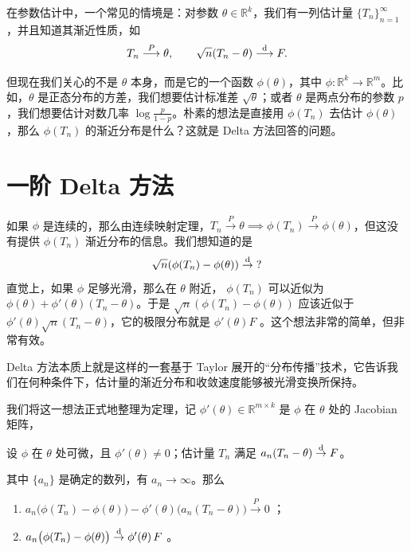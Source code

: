在参数估计中，一个常见的情境是：对参数 $\theta\in\mathbb R^k$，我们有一列估计量 $\{T_n\}_{n=1}^\infty$，并且知道其渐近性质，如
\[
T_n\overset{P}\longrightarrow\theta,
\qquad
\sqrt n(T_n-\theta)\overset{\rm d}\longrightarrow F.
\]

但现在我们关心的不是 $\theta$ 本身，而是它的一个函数 $\phi(\theta)$，其中 $\phi:\mathbb R^k\to\mathbb R^m$。比如，$\theta$ 是正态分布的方差，我们想要估计标准差 $\sqrt\theta$；或者 $\theta$ 是两点分布的参数 $p$，我们想要估计对数几率 $\log\tfrac p{1-p}$。朴素的想法是直接用 $\phi(T_n)$ 去估计 $\phi(\theta)$，那么 $\phi(T_n)$ 的渐近分布是什么？这就是 Delta 方法回答的问题。

\section{一阶 Delta 方法}

如果 $\phi$ 是连续的，那么由连续映射定理，$T_n\overset{P}\to\theta\implies \phi(T_n) \overset{P}\to \phi(\theta)$，但这没有提供 $\phi(T_n)$ 渐近分布的信息。我们想知道的是
\[\sqrt n(\phi(T_n)-\phi(\theta))\overset{\rm d}\to \;?\]
直觉上，如果 $\phi$ 足够光滑，那么在 $\theta$ 附近， $\phi(T_n)$ 可以近似为 $\phi(\theta) + \phi'(\theta)(T_n-\theta)$。于是 $\sqrt{n}(\phi(T_n)-\phi(\theta))$ 应该近似于 $\phi'(\theta) \sqrt{n}(T_n-\theta)$，它的极限分布就是 $\phi'(\theta)F$ 。这个想法非常的简单，但非常有效。

Delta 方法本质上就是这样的一套基于 Taylor 展开的``分布传播''技术，它告诉我们在何种条件下，估计量的渐近分布和收敛速度能够被光滑变换所保持。

我们将这一想法正式地整理为定理，记 $\phi'(\theta)\in\mathbb R^{m\times k}$ 是 $\phi$ 在 $\theta$ 处的 Jacobian 矩阵，

\begin{theorem}[一阶 Delta 方法]\label{thm:ch5:first-order-delta}

设 $\phi$ 在 $\theta$ 处可微，且 $\phi'(\theta)\neq 0$；估计量 $T_n$ 满足 $a_n(T_n-\theta)\overset{\rm d}\to F$。

其中 $\{a_n\}$ 是确定的数列，有 $a_n\to \infty$。那么

\begin{enumerate}
\def\labelenumi{\arabic{enumi}.}
\tightlist
\item
  $a_n\big(\phi(T_n)-\phi(\theta)\big) - \phi'(\theta)\big(a_n(T_n-\theta)\big) \overset{P}\to 0$ ；
\item
  $a_n\big(\phi(T_n)-\phi(\theta)\big) \overset{\rm d}\to \phi'(\theta)\,F$ 。
\end{enumerate}

\end{theorem}

